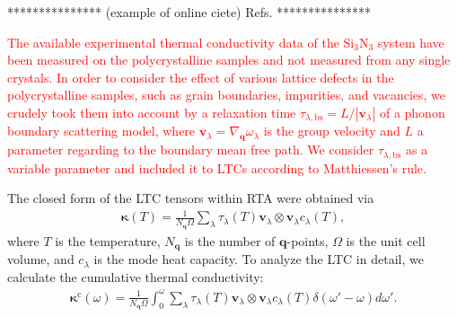 \documentclass[twocolumn,amsmath,amssymb,a4paper,prb,superscriptaddress,floatfix]{revtex4-1}
\begin{document}
***************
(example of online ciete) Refs. 
***************

\textcolor{red}{The available experimental thermal conductivity data of
the Si$_3$N$_3$ system have been measured on the polycrystalline samples
and not measured from any single crystals. In order to consider the
effect of various lattice defects in the polycrystalline samples, such
as grain boundaries, impurities, and vacancies, we crudely took them
into account by a relaxation time
$\tau_{\lambda,\text{bs}}=L/|\mathbf{v}_\lambda|$ of a phonon boundary
scattering model, where $\mathbf{v}_\lambda =
\nabla_{\mathbf{q}}\omega_\lambda$ is the group velocity and $L$ a
parameter regarding to the boundary mean free path. We consider
$\tau_{\lambda,\text{bs}}$ as a variable parameter and included it to
LTCs according to Matthiessen's rule.}

The closed form of the LTC tensors within RTA were obtained via 
\begin{align}
 \label{eq:kappa}
 \boldsymbol{\kappa}(T) = \frac{1}{N_\mathbf{q}\Omega} \sum_\lambda
 \tau_\lambda(T) \mathbf{v}_\lambda \otimes \mathbf{v}_\lambda c_\lambda(T),
\end{align}
where $T$ is the temperature, $N_\mathbf{q}$ is the number of
$\mathbf{q}$-points, $\Omega$ is the unit cell volume, and $c_\lambda$
is the mode heat capacity. To analyze the LTC in detail, we calculate
the cumulative thermal conductivity:
\begin{align}
 \label{eq:cum-kappa}
 \boldsymbol{\kappa}^\text{c}(\omega) = \frac{1}{N_\mathbf{q}\Omega}
 \int_0^\omega \sum_\lambda
 \tau_\lambda(T) \mathbf{v}_\lambda \otimes \mathbf{v}_\lambda
 c_\lambda(T) \delta(\omega'-\omega)d\omega'.
\end{align}
\end{document}
